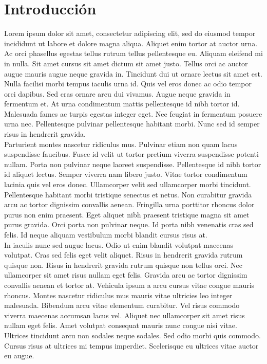 \section{Introducción}

Lorem ipsum dolor sit amet, consectetur adipiscing elit, sed do eiusmod tempor incididunt ut labore et dolore magna aliqua. Aliquet enim tortor at auctor urna. Ac orci phasellus egestas tellus rutrum tellus pellentesque eu. Aliquam eleifend mi in nulla. Sit amet cursus sit amet dictum sit amet justo. Tellus orci ac auctor augue mauris augue neque gravida in. Tincidunt dui ut ornare lectus sit amet est. Nulla facilisi morbi tempus iaculis urna id. Quis vel eros donec ac odio tempor orci dapibus. Sed cras ornare arcu dui vivamus. Augue neque gravida in fermentum et. At urna condimentum mattis pellentesque id nibh tortor id. Malesuada fames ac turpis egestas integer eget. Nec feugiat in fermentum posuere urna nec. Pellentesque pulvinar pellentesque habitant morbi. Nunc sed id semper risus in hendrerit gravida.\\

Parturient montes nascetur ridiculus mus. Pulvinar etiam non quam lacus suspendisse faucibus. Fusce id velit ut tortor pretium viverra suspendisse potenti nullam. Porta non pulvinar neque laoreet suspendisse. Pellentesque id nibh tortor id aliquet lectus. Semper viverra nam libero justo. Vitae tortor condimentum lacinia quis vel eros donec. Ullamcorper velit sed ullamcorper morbi tincidunt. Pellentesque habitant morbi tristique senectus et netus. Non curabitur gravida arcu ac tortor dignissim convallis aenean. Fringilla urna porttitor rhoncus dolor purus non enim praesent. Eget aliquet nibh praesent tristique magna sit amet purus gravida. Orci porta non pulvinar neque. Id porta nibh venenatis cras sed felis. Id neque aliquam vestibulum morbi blandit cursus risus at.\\

In iaculis nunc sed augue lacus. Odio ut enim blandit volutpat maecenas volutpat. Cras sed felis eget velit aliquet. Risus in hendrerit gravida rutrum quisque non. Risus in hendrerit gravida rutrum quisque non tellus orci. Nec ullamcorper sit amet risus nullam eget felis. Gravida arcu ac tortor dignissim convallis aenean et tortor at. Vehicula ipsum a arcu cursus vitae congue mauris rhoncus. Montes nascetur ridiculus mus mauris vitae ultricies leo integer malesuada. Bibendum arcu vitae elementum curabitur. Vel risus commodo viverra maecenas accumsan lacus vel. Aliquet nec ullamcorper sit amet risus nullam eget felis. Amet volutpat consequat mauris nunc congue nisi vitae. Ultrices tincidunt arcu non sodales neque sodales. Sed odio morbi quis commodo. Cursus risus at ultrices mi tempus imperdiet. Scelerisque eu ultrices vitae auctor eu augue.\\

